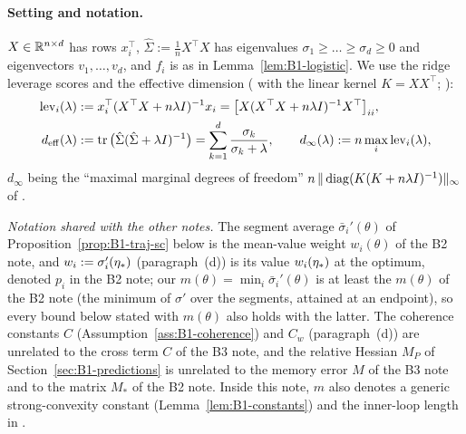 \paragraph{Setting and notation.}
$X\in\mathbb{R}^{n\times d}$ has rows $x_i^\top$, $\hat\Sigma:=\frac1nX^\top X$ has eigenvalues
$\sigma_1\ge\dots\ge\sigma_d\ge0$ and eigenvectors $v_1,\dots,v_d$, and $f_i$ is as in
Lemma~\ref{lem:B1-logistic}. We use the ridge leverage scores and the effective dimension
(\cite[Def.~1]{elalaoui2015fast} with the linear kernel $K=XX^\top$; \cite[Sec.~4.1]{bach2013sharp}):
\begin{align}
\mathrm{lev}_i(\lambda)&:=x_i^\top(X^\top X+n\lambda I)^{-1}x_i=\big[X(X^\top X+n\lambda I)^{-1}X^\top\big]_{ii},\label{eq:B1-leverage-def}\\
d_{\mathrm{eff}}(\lambda)&:=\operatorname{tr}\big(\hat\Sigma(\hat\Sigma+\lambda I)^{-1}\big)=\sum_{k=1}^d\frac{\sigma_k}{\sigma_k+\lambda},\qquad
d_{\infty}(\lambda):=n\max_i\mathrm{lev}_i(\lambda),\nonumber
\end{align}
$d_\infty$ being the ``maximal marginal degrees of freedom''
$n\,\|\operatorname{diag}(K(K+n\lambda I)^{-1})\|_\infty$ of \cite[Sec.~4.1, eq.~(5)]{bach2013sharp}.

\emph{Notation shared with the other notes.} The segment average $\bar\sigma_i'(\theta)$ of
Proposition~\ref{prop:B1-traj-sc} below is the mean-value weight $w_i(\theta)$ of the B2 note, and
$w_i:=\sigma_i'(\eta_\ast)$ (paragraph~(d)) is its value $w_i(\eta_\ast)$ at the optimum, denoted $p_i$ in the B2
note; our $m(\theta)=\min_i\bar\sigma_i'(\theta)$ is at least the $m(\theta)$ of the B2 note (the minimum of
$\sigma'$ over the segments, attained at an endpoint), so every bound below stated with $m(\theta)$ also holds
with the latter. The coherence constants $C$ (Assumption~\ref{ass:B1-coherence}) and $C_w$ (paragraph~(d)) are
unrelated to the cross term $C$ of the B3 note, and the relative Hessian $M_P$ of
Section~\ref{sec:B1-predictions} is unrelated to the memory error $M$ of the B3 note and to the matrix
$M_\ast$ of the B2 note. Inside this note, $m$ also denotes a generic strong-convexity constant
(Lemma~\ref{lem:B1-constants}) and the inner-loop length in \cite{moritz2016linearly,gower2016stochastic}.

